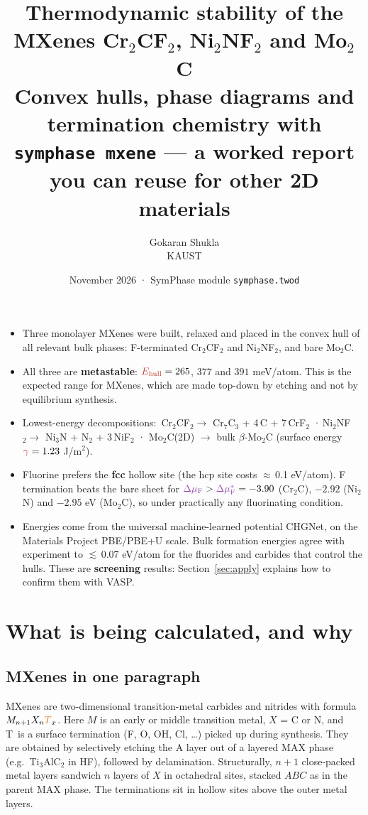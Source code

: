 \documentclass[11pt,a4paper]{article}
\title{\textbf{Thermodynamic stability of the MXenes Cr$_2$CF$_2$, Ni$_2$NF$_2$ and Mo$_2$C}\\[0.3em]
\large Convex hulls, phase diagrams and termination chemistry with \texttt{symphase mxene} --- a worked report you can reuse for other 2D materials}
\author{Gokaran Shukla\\ \small KAUST}
\date{\small November 2026 \;·\; SymPhase module \texttt{symphase.twod}}
\newcommand{\Eh}{\textcolor{ecol}{E_{\mathrm{hull}}}}
\newcommand{\dmu}{\textcolor{mucol}{\Delta\mu_{\mathrm F}}}
\newcommand{\dmustar}{\textcolor{mucol}{\Delta\mu_{\mathrm F}^{*}}}
\newcommand{\Tm}{\textcolor{tcol}{T}}
\newcommand{\gam}{\textcolor{ecol}{\gamma}}
\begin{document}
\maketitle

\begin{tcolorbox}[colback=gray!4,colframe=gray!50,title=\textbf{Summary},fonttitle=\bfseries]
\begin{itemize}
\item Three monolayer MXenes were built, relaxed and placed in the convex hull of all relevant bulk phases:
F-terminated Cr$_2$CF$_2$ and Ni$_2$NF$_2$, and bare Mo$_2$C.
\item All three are \textbf{metastable}: $\Eh = 265$, $377$ and $391$ meV/atom. This is the expected range for MXenes, which are made
top-down by etching and not by equilibrium synthesis.
\item Lowest-energy decompositions: \,Cr$_2$CF$_2\to$ Cr$_7$C$_3$ + 4\,C + 7\,CrF$_2$ \;·\,Ni$_2$NF$_2\to$ Ni$_3$N + N$_2$ + 3\,NiF$_2$ \;·\;
Mo$_2$C(2D) $\to$ bulk $\beta$-Mo$_2$C (surface energy $\gam = 1.23$ J/m$^2$).
\item Fluorine prefers the \textbf{fcc} hollow site (the hcp site costs $\approx$\,0.1 eV/atom). F termination beats the bare sheet for
$\dmu > \dmustar = -3.90$ (Cr$_2$C), $-2.92$ (Ni$_2$N) and $-2.95$ eV (Mo$_2$C), so under practically any fluorinating condition.
\item Energies come from the universal machine-learned potential CHGNet, on the Materials Project PBE/PBE+U scale. Bulk formation energies
agree with experiment to $\lesssim$\,0.07 eV/atom for the fluorides and carbides that control the hulls. These are \textbf{screening}
results: Section~\ref{sec:apply} explains how to confirm them with VASP.
\end{itemize}
\end{tcolorbox}

\tableofcontents
\newpage

\section{What is being calculated, and why}
\label{sec:concepts}

\subsection{MXenes in one paragraph}
MXenes are two-dimensional transition-metal carbides and nitrides with formula $M_{n+1}X_n\Tm_x$. Here $M$ is an early or middle transition metal,
$X$ = C or N, and \Tm\ is a surface termination (F, O, OH, Cl, \dots) picked up during synthesis. They are obtained by selectively etching
the A layer out of a layered MAX phase (e.g.\ Ti$_3$AlC$_2$ in HF), followed by delamination. Structurally, $n+1$ close-packed metal layers
sandwich $n$ layers of $X$ in octahedral sites, stacked $ABC$ as in the parent MAX phase. The terminations sit in hollow sites above the outer
metal layers.
\end{document}
